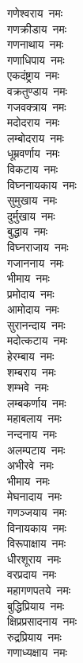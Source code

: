 \begin{multicols}{2}
\begin{flushleft}
गणेश्वराय~नमः\\
गणक्रीडाय~नमः\\
गणनाथाय~नमः\\
गणाधिपाय~नमः\\
एकदंष्ट्राय~नमः\\
वक्रतुण्डाय~नमः\\
गजवक्त्राय~नमः\\
मदोदराय~नमः\\
लम्बोदराय~नमः\\
धूम्रवर्णाय~नमः\hfill{}\\
विकटाय~नमः\\
विघ्ननायकाय~नमः\\
सुमुखाय~नमः\\
दुर्मुखाय~नमः\\
बुद्धाय~नमः\\
विघ्नराजाय~नमः\\
गजाननाय~नमः\\
भीमाय~नमः\\
प्रमोदाय~नमः\\
आमोदाय~नमः\hfill{}\\
सुरानन्दाय~नमः\\
मदोत्कटाय~नमः\\
हेरम्बाय~नमः\\
शम्बराय~नमः\\
शम्भवे~नमः\\
लम्बकर्णाय~नमः\\
महाबलाय~नमः\\
नन्दनाय~नमः\\
अलम्पटाय~नमः\\
अभीरवे~नमः\hfill{}\\
भीमाय~नमः\\
मेघनादाय~नमः\\
गणञ्जयाय~नमः\\
विनायकाय~नमः\\
विरूपाक्षाय~नमः\\
धीरशूराय~नमः\\
वरप्रदाय~नमः\\
महागणपतये~नमः\\
बुद्धिप्रियाय~नमः\\
क्षिप्रप्रसादनाय~नमः\hfill{}\\
रुद्रप्रियाय~नमः\\
गणाध्यक्षाय~नमः\\

\end{flushleft}
\end{multicols}
